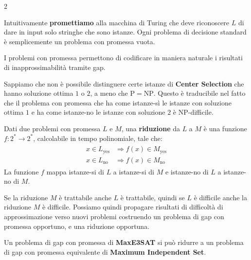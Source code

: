 \documentclass[\main/main.tex]{subfiles}
\begin{document}
\begin{multicols}{2}
\begin{definition}
    Intuitivamente \textbf{promettiamo} alla macchina di Turing che deve riconoscere \(L\) di dare in input solo stringhe che sono istanze. Ogni problema di decisione standard è semplicemente un problema con promessa vuota.
\end{definition}
\begin{observation}
    I problemi con promessa permettono di codificare in maniera naturale i risultati di inapprossimabilità tramite gap. 
\end{observation}
\begin{example}
    Sappiamo che non è possibile distinguere certe istanze di \textbf{Center Selection} che hanno soluzione ottima \(1\) o \(2\), a meno che \(\mathrm{P}=\mathrm{NP}\). Questo è traducibile nel fatto che il problema con promessa che ha come istanze-sì le istanze con soluzione ottima \(1\) e ha come istanze-no le istanze con soluzione \(2\) è NP-difficile.
\end{example}
\begin{definition}[Riduzione]
    Dati due problemi con promessa \(L\) e \(M\), una \textbf{riduzione} da \(L\) a \(M\) è una funzione \(f : 2^{*} \rightarrow 2^{*}\), calcolabile in tempo polinomiale, tale che:
    \begin{align*}
        \begin{aligned}
            x \in L_{\mathrm{yes}} & \Longrightarrow f(x) \in M_{\mathrm{yes}} \\
            x \in L_{\mathrm{no}} & \Longrightarrow f(x) \in M_{\mathrm{no}}
        \end{aligned}
    \end{align*}
    La funzione \(f\) mappa istanze-si di \(L\) a istanze-si di \(M\) e istanze-no di \(L\) a istanze-no di \(M\).
\end{definition}
\begin{observation}
    Se la riduzione \(M\) è trattabile anche \(L\) è trattabile, quindi se \(L\) è difficile anche la riduzione \(M\) è difficile. Possiamo quindi propagare risultati di difficoltà di approssimazione verso nuovi problemi costruendo un problema di gap con promessa opportuno, e una riduzione opportuna.
\end{observation}
\begin{example}
    Un problema di gap con promessa di \textbf{MaxE3SAT} si può ridurre a un problema di gap con promessa equivalente di \textbf{Maximum Independent Set}.
    

\end{example}
\end{multicols}
\end{document}
